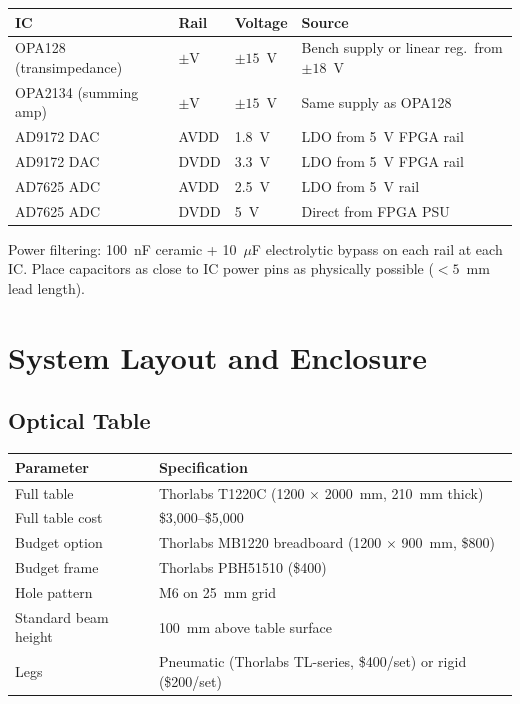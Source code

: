 \documentclass[11pt,a4paper,openany]{book}
\begin{document}
\begin{center}
\begin{tabular}{llll}
\toprule
\textbf{IC} & \textbf{Rail} & \textbf{Voltage} & \textbf{Source} \\
\midrule
OPA128 (transimpedance) & $\pm$V & $\pm 15$~V & Bench supply or linear reg.\ from $\pm 18$~V \\
OPA2134 (summing amp) & $\pm$V & $\pm 15$~V & Same supply as OPA128 \\
AD9172 DAC & AVDD & 1.8~V & LDO from 5~V FPGA rail \\
AD9172 DAC & DVDD & 3.3~V & LDO from 5~V FPGA rail \\
AD7625 ADC & AVDD & 2.5~V & LDO from 5~V rail \\
AD7625 ADC & DVDD & 5~V & Direct from FPGA PSU \\
\bottomrule
\end{tabular}
\end{center}

\noindent
Power filtering: 100~nF ceramic + 10~$\mu$F electrolytic bypass on each rail at each IC. Place capacitors as close to IC power pins as physically possible ($< 5$~mm lead length).


\chapter{System Layout and Enclosure}\label{ch:layout}

\section{Optical Table}

\begin{center}
\begin{tabular}{ll}
\toprule
\textbf{Parameter} & \textbf{Specification} \\
\midrule
Full table & Thorlabs T1220C (1200 $\times$ 2000~mm, 210~mm thick) \\
Full table cost & \$3,000--\$5,000 \\
Budget option & Thorlabs MB1220 breadboard (1200 $\times$ 900~mm, \$800) \\
Budget frame & Thorlabs PBH51510 (\$400) \\
Hole pattern & M6 on 25~mm grid \\
Standard beam height & 100~mm above table surface \\
Legs & Pneumatic (Thorlabs TL-series, \$400/set) or rigid (\$200/set) \\
\bottomrule
\end{tabular}
\end{center}
\end{document}
